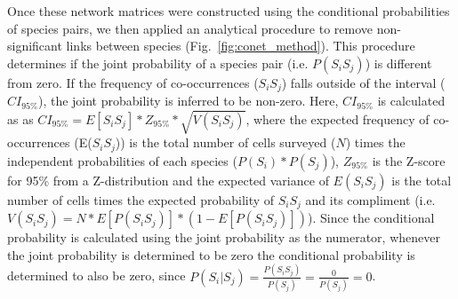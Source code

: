 \documentclass[9pt,twocolumn,twoside,lineno]{pnas-new}
\begin{document}
{Once these network matrices were constructed using the conditional
probabilities of species pairs, we then applied an analytical
procedure to remove non-significant links between species
(Fig.~\ref{fig:conet_method}). This procedure determines if the joint
probability of a species pair (i.e. $P(S_iS_j)$) is different from
zero.  If the frequency of co-occurrences ($S_iS_j$) falls outside of
the interval ($CI_{95\%}$), the joint probability is inferred to be
non-zero. Here, $CI_{95\%}$ is calculated as as $CI_{95\%} = E[S_iS_j]
* Z_{95\%} * \sqrt{V(S_iS_j)}$, where the expected frequency of
co-occurrences (E($S_iS_j$)) is the total number of cells surveyed
($N$) times the independent probabilities of each species ($P(S_i) *
P(S_j)$), $Z_{95\%}$ is the Z-score for 95\% from a Z-distribution and
the expected variance of $E(S_iS_j)$ is the total number of cells
times the expected probability of $S_iS_j$ and its compliment
(i.e. $V(S_iS_j) = N * E[P(S_iS_j)] * (1 - E[P(S_iS_j)])$). Since the
conditional probability is calculated using the joint probability as
the numerator, whenever the joint probability is determined to be zero
the conditional probability is determined to also be zero, since
$P(S_i|S_j) = \frac{P(S_iS_j)}{P(S_j)} = \frac{0}{P(S_j)} = 0$.






}
\end{document}
